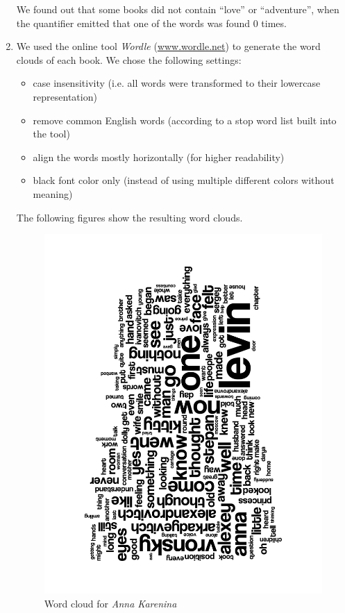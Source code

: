 \documentclass[a4paper,11pt,oneside]{book}
\begin{document}
\begin{enumerate}
We found out that some books did not contain ``love'' or ``adventure'', when the quantifier emitted that one of the words was found 0 times.
	\item We used the online tool \emph{Wordle} (\url{www.wordle.net}) to generate the word clouds of each book. We chose the following settings:
				\begin{itemize}
					\item case insensitivity (i.e. all words were transformed to their lowercase representation)
					\item remove common English words (according to a stop word list built into the tool)
					\item align the words mostly horizontally (for higher readability)
					\item black font color only (instead of using multiple different colors without meaning)
				\end{itemize} 
				The following figures show the resulting word clouds.
				\begin{figure}[htb]
					\begin{center}
					\includegraphics[angle=270,width=0.8\columnwidth]{resources/wordclouds/AnnaKarenina_WordCloud.pdf}%
					\end{center}
					\caption{Word cloud for \emph{Anna Karenina}}%

\end{figure}
\end{enumerate}
\end{document}
